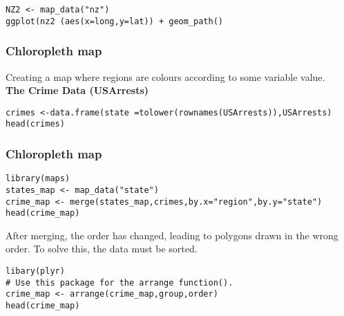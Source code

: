 \documentclass{beamer}
\begin{document}
\begin{frame}
\begin{frame}
\begin{framed}
\begin{verbatim}
NZ2 <- map_data("nz")
ggplot(nz2 (aes(x=long,y=lat)) + geom_path()
\end{verbatim}
\end{framed}
\end{frame}





\begin{frame}[fragile]
\frametitle{Chloropleth map}
Creating a map where regions are colours according to some variable value.
\\

\textbf{The Crime Data (USArrests)}

\begin{framed}
\begin{verbatim}
crimes <-data.frame(state =tolower(rownames(USArrests)),USArrests)
head(crimes)
\end{verbatim}
\end{framed}
\end{frame}

\begin{frame}[fragile]
\frametitle{Chloropleth map}

\begin{framed}
\begin{verbatim}
library(maps)
states_map <- map_data("state")
crime_map <- merge(states_map,crimes,by.x="region",by.y="state")
head(crime_map)

\end{verbatim}
\end{framed}

\end{frame}

\begin{frame}[fragile]
After merging, the order has changed, leading to polygons drawn in the wrong order.
To solve this, the data must be sorted.
\begin{framed}
\begin{verbatim}
libary(plyr)
# Use this package for the arrange function().
crime_map <- arrange(crime_map,group,order)
head(crime_map)
\end{verbatim}
\end{framed}
\end{frame}


\end{frame}
\end{document}

